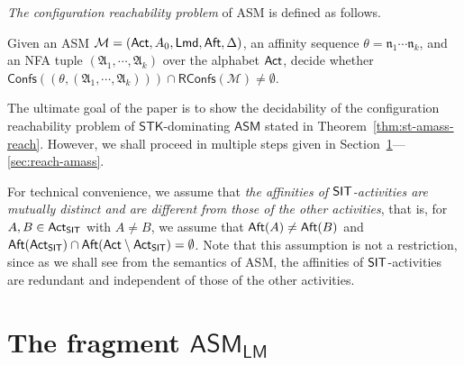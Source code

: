 \documentclass[preprint,12pt]{elsarticle}
\newcommand\Mm{{\mathcal{M} }}
\newcommand\act{{\sf Act}}
\newcommand\aft{{\sf Aft}}
\newcommand\lmd{{\sf Lmd}}
\newcommand\singleinstance{{\sf SIT}}
\newcommand{\AMASS}{\textsf{ASM}}
\newcommand{\LMAMASS}{\textsf{ASM}_\textsf{LM}}
\newcommand\confs{{\mathsf{Confs} }}
\newcommand\namefun{\mathcal{N}}
\newcommand\aname{\mathfrak{n}}
\newcommand\RConfs{\mathsf{RConfs}}
\newcommand{\STK}{\mathsf{STK}}
\newcommand\Aut{{\mathfrak{A} }}
\newcommand{\NFA}{\textsf{NFA}}
\newcommand\gettsk{\mathsf{GetTsk}}
\begin{document}
\emph{The configuration reachability problem} of {\AMASS} is defined as follows. 
\smallskip

\fbox
{
	\begin{minipage}{0.9\textwidth} 
 	Given an {\AMASS} $\Mm= (\act, A_0, \lmd, \aft, \Delta)$, an affinity sequence $\theta = \aname_1\cdots\aname_k$, and an {\NFA} tuple $(\Aut_1,\cdots,\Aut_k)$ over the alphabet $\act$, decide whether $ \confs({(\theta, (\Aut_1,\cdots,\Aut_k))}) \cap \RConfs(\Mm) \neq \emptyset$.
 \end{minipage}
}
\smallskip

The ultimate goal of the paper is to show the decidability of the configuration reachability problem of $\STK$-dominating $\AMASS$  stated in Theorem~\ref{thm:st-amass-reach}. However, we shall proceed in multiple steps given in Section~\ref{sec:reach-lmamass}---\ref{sec:reach-amass}.

For technical convenience, we assume that \emph{the affinities of $\singleinstance$-activities are mutually distinct and are different from those of the other activities}, that is, for $A, B \in \act_\singleinstance$ with $A \neq B$, we assume that  $\aft(A) \neq \aft(B)$ and $\aft(\act_\singleinstance) \cap \aft(\act \setminus \act_\singleinstance) = \emptyset$.
%
Note that this assumption is not a restriction, since as we shall see from the semantics of {\AMASS}, the affinities of $\singleinstance$-activities are redundant and independent of those of the other activities. 





 

\section{The fragment $\LMAMASS$}\label{sec:reach-lmamass}
%
\end{document}
